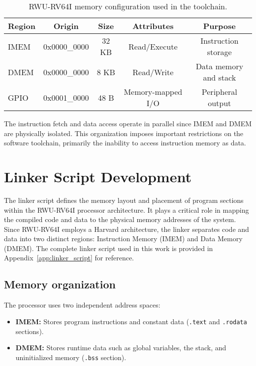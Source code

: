 \begin{table}[h]
\centering
\begin{tabular}{lcccc}
\toprule
\textbf{Region} & \textbf{Origin} & \textbf{Size} & \textbf{Attributes} & \textbf{Purpose}\\
\midrule
IMEM & 0x0000\_0000 & 32 KB & Read/Execute & Instruction storage\\
DMEM & 0x0000\_0000 & 8 KB  & Read/Write   & Data memory and stack\\
GPIO & 0x0001\_0000 & 48 B & Memory-mapped I/O & Peripheral output\\
\bottomrule
\end{tabular}
\caption{RWU-RV64I memory configuration used in the toolchain.}
\end{table}

The instruction fetch and data access operate in parallel since IMEM and DMEM are physically isolated.  
This organization imposes important restrictions on the software toolchain, primarily the inability to access instruction memory as data.

\section{Linker Script Development}
\label{sec:linker_script}

The linker script defines the memory layout and placement of program sections within the RWU-RV64I processor architecture.  
It plays a critical role in mapping the compiled code and data to the physical memory addresses of the system.  
Since RWU-RV64I employs a Harvard architecture, the linker separates code and data into two distinct regions: Instruction Memory (IMEM) and Data Memory (DMEM). The complete linker script used in this work is provided in Appendix~\ref{app:linker_script} for reference.

\subsection*{Memory organization}

The processor uses two independent address spaces:
\begin{itemize}
  \item \textbf{IMEM:} Stores program instructions and constant data (\texttt{.text} and \texttt{.rodata} sections).
  \item \textbf{DMEM:} Stores runtime data such as global variables, the stack, and uninitialized memory (\texttt{.bss} section).
\end{itemize}

